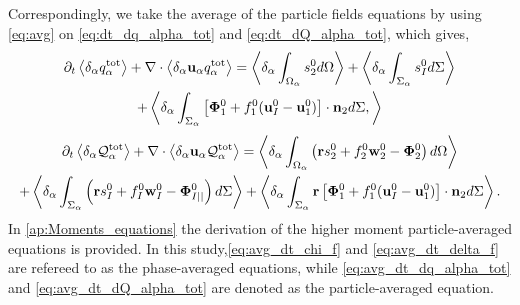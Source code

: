 Correspondingly, we take the average of the particle fields equations by using \ref{eq:avg} on \ref{eq:dt_dq_alpha_tot} and \ref{eq:dt_dQ_alpha_tot}, which gives, 
\begin{multline}
    \partial_t \left<\delta_\alpha  q_\alpha^\text{tot}\right>
    + \mathbf{\nabla}\cdot \left<\delta_\alpha\textbf{u}_\alpha q_\alpha^\text{tot}\right>
    = \left<\delta_\alpha\int_{\Omega_\alpha} s_2^0 d\Omega\right>
    + \left<\delta_\alpha\int_{\Sigma_\alpha} s_I^0 d\Sigma\right>\\
    + \left<\delta_\alpha\int_{\Sigma_\alpha} \left[\mathbf{\Phi}_1^0 + f_1^0 (\textbf{u}_I^0-\textbf{u}_1^0) \right] \cdot \textbf{n}_2 d\Sigma,\right>
    \label{eq:avg_dt_dq_alpha_tot}
\end{multline}
\begin{multline}
    \partial_t \left<\delta_\alpha \mathcal{Q}_\alpha^\text{tot}\right>
    + \mathbf{\nabla}\cdot \left<\delta_\alpha\textbf{u}_\alpha\mathcal{Q}_\alpha^\text{tot}\right>
    =\left<\delta_\alpha\int_{\Omega_\alpha} \left(
        \textbf{r} s_2^0         
        + f_2^0  \textbf{w}_2^0 
        - \mathbf{\Phi}_2^0
    \right) d\Omega\right>\\
    + \left<\delta_\alpha\int_{\Sigma_\alpha} \left(
        \textbf{r}s_I^0
        + f_I^0 \textbf{w}_I^0
        - \mathbf{\Phi}_{I||}^0
    \right) d\Sigma\right>
    + \left<\delta_\alpha\int_{\Sigma_\alpha} \textbf{r} \left[
        \mathbf{\Phi}_1^0
        + f_1^0 (\textbf{u}_I^0-\textbf{u}_1^0)
    \right]\cdot \textbf{n}_2  d\Sigma\right>.
    \label{eq:avg_dt_dQ_alpha_tot}
\end{multline}
In \ref{ap:Moments_equations} the derivation of the higher moment particle-averaged equations is provided. 
In this study,\ref{eq:avg_dt_chi_f} and \ref{eq:avg_dt_delta_f} are refereed to as the phase-averaged equations, while \ref{eq:avg_dt_dq_alpha_tot} and \ref{eq:avg_dt_dQ_alpha_tot} are denoted as the particle-averaged equation. 